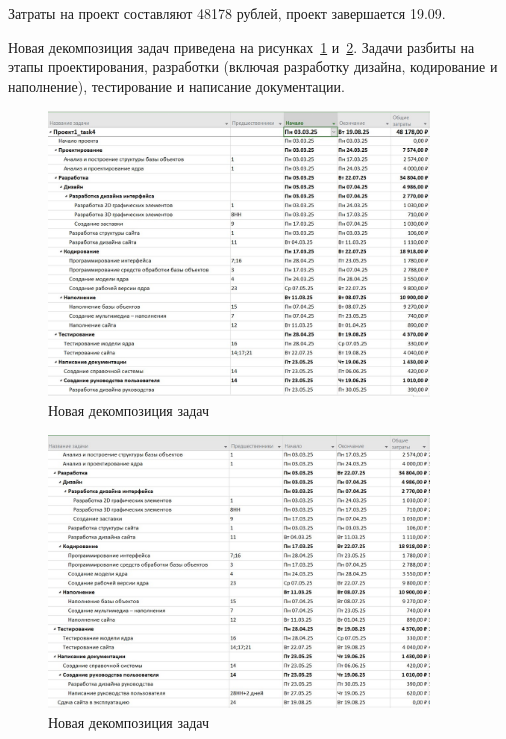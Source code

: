 Затраты на проект составляют 48178 рублей, проект завершается 19.09.

Новая декомпозиция задач приведена на рисунках~\ref{fig:5_screen10} и~\ref{fig:5_screen11}.
Задачи разбиты на этапы проектирования, разработки (включая разработку дизайна, кодирование и наполнение), тестирование и написание документации.

\begin{figure}[H]
	\centering
	\includegraphics[width=0.9\textwidth]{img/lab5/screen5_2.jpg}
	\caption{Новая декомпозиция задач}
	\label{fig:5_screen10}
\end{figure}

\begin{figure}[H]
	\centering
	\includegraphics[width=0.9\textwidth]{img/lab5/screen5_3.jpg}
	\caption{Новая декомпозиция задач}
	\label{fig:5_screen11}
\end{figure}

